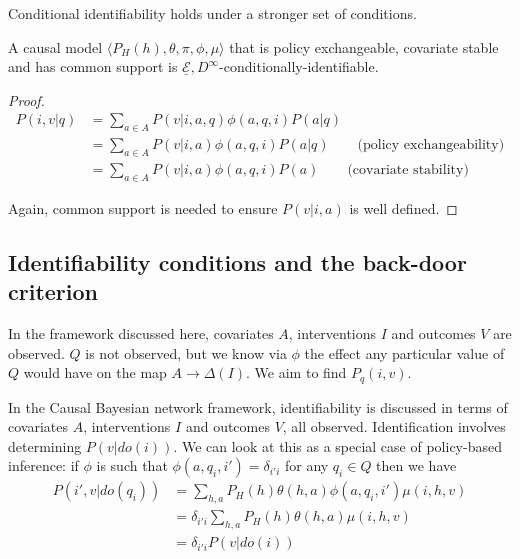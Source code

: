 Conditional identifiability holds under a stronger set of conditions.

\begin{theorem}
A causal model $\langle P_H(h),\theta,\pi,\phi,\mu \rangle$ that is policy exchangeable, covariate stable and has common support is $\underline{\mathscr{E}}, D^\infty$-conditionally-identifiable.
\end{theorem}

\begin{proof}
\begin{align}
    P(i,v|q) &= \sum_{a\in A} P(v|i,a,q) \phi(a,q,i) P(a|q) \\
             &= \sum_{a\in A} P(v|i,a) \phi(a,q,i) P(a|q) \qquad\text{(policy exchangeability)}\\
             &= \sum_{a\in A} P(v|i,a) \phi(a,q,i) P(a) \qquad \text{(covariate stability)}
\end{align}

Again, common support is needed to ensure $P(v|i,a)$ is well defined.    

\end{proof}

\subsection{Identifiability conditions and the back-door criterion}

In the framework discussed here, covariates $A$, interventions $I$ and outcomes $V$ are observed. $Q$ is not observed, but we know via $\phi$ the effect any particular value of $Q$ would have on the map $A\to\Delta(I)$. We aim to find $P_q(i,v)$.

In the Causal Bayesian network framework, identifiability is discussed in terms of covariates $A$, interventions $I$ and outcomes $V$, all observed. Identification involves determining $P(v|do(i))$. We can look at this as a special case of policy-based inference: if $\phi$ is such that $\phi(a,q_i,i')=\delta_{i'i}$ for any $q_i\in Q$ then we have
\begin{align}
    P(i',v|do(q_i)) &= \sum_{h,a} P_H(h) \theta(h,a) \phi(a,q_i,i') \mu(i,h,v) \\
                    &= \delta_{i'i} \sum_{h,a} P_H(h) \theta(h,a) \mu(i,h,v) \\
                    &= \delta_{i'i} P(v|do(i))
\end{align}

